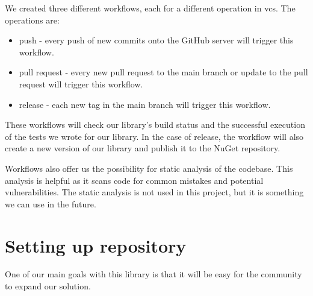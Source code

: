 We created three different workflows, each for a different operation in \acrshort{vcs}. The operations are:
\begin{itemize}
    \item push - every push of new commits onto the GitHub server will trigger this workflow.
    \item pull request - every new pull request to the main branch or update to the pull request will trigger this workflow.
    \item release - each new tag in the main branch will trigger this workflow.
\end{itemize}
These workflows will check our library's build status and the successful execution of the tests we wrote for our library.
In the case of release, the workflow will also create a new version of our library and publish it to the NuGet repository.

Workflows also offer us the possibility for static analysis of the codebase. This analysis is helpful as it scans code for common mistakes and
potential vulnerabilities. The static analysis is not used in this project, but it is something we can use in the future.

\section{Setting up repository}

One of our main goals with this library is that it will be easy for the community to expand our solution.

